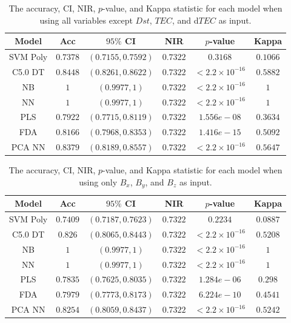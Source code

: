 \documentclass[sn-mathphys-num]{sn-jnl}%
\begin{document}
\begin{table}[!ht]
    \centering
    \caption{The accuracy, CI, NIR, $p$-value, and Kappa statistic for each model when using all variables except $Dst$, $TEC$, and d$TEC$ as input.}
	\label{tab:stats:reverse:no_TotalElectronContent}
	\begin{tabular}{|c|c|c|c|c|c|}
		\hline
		Model & Acc & $95\%$ CI & NIR & $p$-value & Kappa \\ \hline
		SVM Poly & $0.7378$ & $(0.7155, 0.7592)$ & $0.7322$ & $0.3168$ & $0.1066$ \\ \hline
		C5.0 DT & $0.8448$ & $(0.8261, 0.8622)$ & $0.7322$ & $< 2.2 \times {10}^{-16}$ & $0.5882$ \\ \hline
		NB & $1$ & $(0.9977, 1)$ & $0.7322$ & $< 2.2 \times {10}^{-16}$ & $1$ \\ \hline
		NN & $1$ & $(0.9977, 1)$ & $0.7322$ & $< 2.2 \times {10}^{-16}$ & $1$ \\ \hline
		PLS & $0.7922$ & $(0.7715, 0.8119)$ & $0.7322$ & $1.556e-08$ & $0.3634$ \\ \hline
		FDA & $0.8166$ & $(0.7968, 0.8353)$ & $0.7322$ & $1.416e-15$ & $0.5092$ \\ \hline
		PCA NN & $0.8379$ & $(0.8189, 0.8557)$ & $0.7322$ & $< 2.2 \times {10}^{-16}$ & $0.5647$ \\ \hline
	\end{tabular}
\end{table}

\begin{table}[!ht]
    \centering
    \caption{The accuracy, CI, NIR, $p$-value, and Kappa statistic for each model when using only $B_{x}$, $B_{y}$, and $B_{z}$ as input.}
	\label{tab:stats:reverse:coord}
	\begin{tabular}{|c|c|c|c|c|c|}
		\hline
		Model & Acc & $95\%$ CI & NIR & $p$-value & Kappa \\ \hline
		SVM Poly & $0.7409$ & $(0.7187, 0.7623)$ & $0.7322$ & $0.2234$ & $0.0887$ \\ \hline
		C5.0 DT & $0.826$ & $(0.8065, 0.8443)$ & $0.7322$ & $< 2.2 \times {10}^{-16}$ & $0.5208$ \\ \hline
		NB & $1$ & $(0.9977, 1)$ & $0.7322$ & $< 2.2 \times {10}^{-16}$ & $1$ \\ \hline
		NN & $1$ & $(0.9977, 1)$ & $0.7322$ & $< 2.2 \times {10}^{-16}$ & $1$ \\ \hline
		PLS & $0.7835$ & $(0.7625, 0.8035)$ & $0.7322$ & $1.284e-06$ & $0.298$ \\ \hline
		FDA & $0.7979$ & $(0.7773, 0.8173)$ & $0.7322$ & $6.224e-10$ & $0.4541$ \\ \hline
		PCA NN & $0.8254$ & $(0.8059, 0.8437)$ & $0.7322$ & $< 2.2 \times {10}^{-16}$ & $0.5242$ \\ \hline
	\end{tabular}
\end{table}
\end{document}
